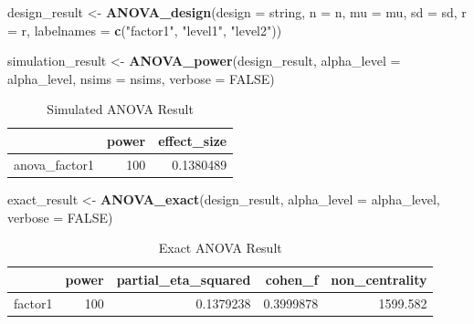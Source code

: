 \documentclass[
]{book}
\newenvironment{Shaded}{\begin{snugshade}}{\end{snugshade}}
\newcommand{\DataTypeTok}[1]{\textcolor[rgb]{0.13,0.29,0.53}{#1}}
\newcommand{\KeywordTok}[1]{\textcolor[rgb]{0.13,0.29,0.53}{\textbf{#1}}}
\newcommand{\NormalTok}[1]{#1}
\newcommand{\OtherTok}[1]{\textcolor[rgb]{0.56,0.35,0.01}{#1}}
\newcommand{\StringTok}[1]{\textcolor[rgb]{0.31,0.60,0.02}{#1}}
\begin{document}
\begin{Shaded}
\begin{Highlighting}[]
\NormalTok{design_result <-}\StringTok{ }\KeywordTok{ANOVA_design}\NormalTok{(}\DataTypeTok{design =}\NormalTok{ string,}
                   \DataTypeTok{n =}\NormalTok{ n, }
                   \DataTypeTok{mu =}\NormalTok{ mu, }
                   \DataTypeTok{sd =}\NormalTok{ sd, }
                   \DataTypeTok{r =}\NormalTok{ r, }
                   \DataTypeTok{labelnames =} \KeywordTok{c}\NormalTok{(}\StringTok{"factor1"}\NormalTok{, }\StringTok{"level1"}\NormalTok{, }\StringTok{"level2"}\NormalTok{))}
\end{Highlighting}
\end{Shaded}

\begin{Shaded}
\begin{Highlighting}[]
\NormalTok{simulation_result <-}\StringTok{ }\KeywordTok{ANOVA_power}\NormalTok{(design_result, }
                                 \DataTypeTok{alpha_level =}\NormalTok{ alpha_level, }
                                 \DataTypeTok{nsims =}\NormalTok{ nsims,}
                                 \DataTypeTok{verbose =} \OtherTok{FALSE}\NormalTok{)}
\end{Highlighting}
\end{Shaded}

\begin{table}[!h]

\caption{\label{tab:unnamed-chunk-62}Simulated ANOVA Result}
\centering
\begin{tabular}[t]{l|r|r}
\hline
  & power & effect\_size\\
\hline
anova\_factor1 & 100 & 0.1380489\\
\hline
\end{tabular}
\end{table}

\begin{Shaded}
\begin{Highlighting}[]
\NormalTok{exact_result <-}\StringTok{ }\KeywordTok{ANOVA_exact}\NormalTok{(design_result,}
                            \DataTypeTok{alpha_level =}\NormalTok{ alpha_level,}
                            \DataTypeTok{verbose =} \OtherTok{FALSE}\NormalTok{)}
\end{Highlighting}
\end{Shaded}

\begin{table}[!h]

\caption{\label{tab:unnamed-chunk-64}Exact ANOVA Result}
\centering
\begin{tabular}[t]{l|r|r|r|r}
\hline
  & power & partial\_eta\_squared & cohen\_f & non\_centrality\\
\hline
factor1 & 100 & 0.1379238 & 0.3999878 & 1599.582\\
\hline
\end{tabular}
\end{table}
\end{document}

